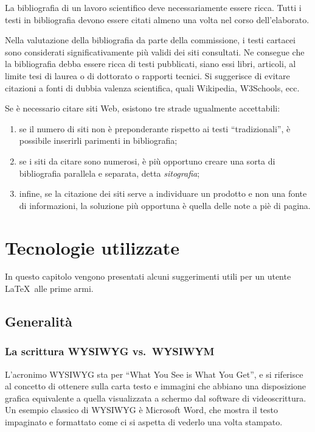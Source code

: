 \documentclass[12pt]{report}
\begin{document}
    La bibliografia di un lavoro scientifico deve necessariamente essere ricca. Tutti i testi in bibliografia devono essere citati almeno una volta nel corso dell'elaborato.

    Nella valutazione della bibliografia da parte della commissione, i testi cartacei sono considerati significativamente più validi dei siti consultati. Ne consegue che la bibliografia debba essere ricca di testi pubblicati, siano essi libri, articoli, al limite tesi di laurea o di dottorato o rapporti tecnici. Si suggerisce di evitare citazioni a fonti di dubbia valenza scientifica, quali Wikipedia, W3Schools, ecc.

    Se è necessario citare siti Web, esistono tre strade ugualmente accettabili:
    \begin{enumerate}
        \item se il numero di siti non è preponderante rispetto ai testi ``tradizionali'', è possibile inserirli parimenti in bibliografia;
        \item se i siti da citare sono numerosi, è più opportuno creare una sorta di bibliografia parallela e separata, detta \textit{sitografia};
        \item infine, se la citazione dei siti serve a individuare un prodotto e non una fonte di informazioni, la soluzione più opportuna è quella delle note a piè di pagina.
    \end{enumerate}


%
%


    \chapter{Tecnologie utilizzate}
    \label{cap3}

    In questo capitolo vengono presentati alcuni suggerimenti utili per un utente \LaTeX\ alle prime armi.


    \section{Generalit\`a}

    \subsection{La scrittura WYSIWYG vs.\ WYSIWYM}

    L'acronimo WYSIWYG sta per ``What You See is What You Get'', e si riferisce al concetto di ottenere sulla carta testo e immagini che abbiano una disposizione grafica equivalente a quella visualizzata a schermo dal software di videoscrittura. Un esempio classico di WYSIWYG è Microsoft Word, che mostra il testo impaginato e formattato come ci si aspetta di vederlo una volta stampato.
\end{document}
